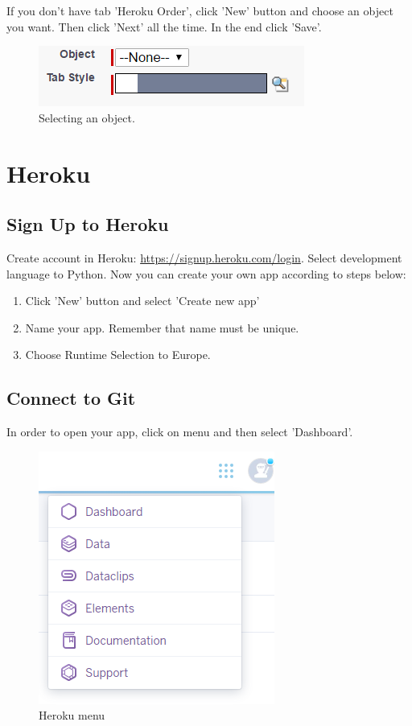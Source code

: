 \documentclass[12pt,a4paper]{article}
\begin{document}
If you don't have tab 'Heroku Order', click 'New' button and choose an object you want. Then click 'Next' all the time. In the end click 'Save'.

\begin{figure}[H]
	\centering
	\includegraphics{images/tabobj.PNG}
	\caption{Selecting an object.}
	\label{fig:tabbb}
\end{figure}
 
\section{Heroku}
\subsection{Sign Up to Heroku}
Create account in Heroku: \url{https://signup.heroku.com/login}. Select development language to Python. 
Now you can create your own app according to steps below:

\begin{enumerate}
	\item Click 'New' button and select 'Create new app'
	\item Name your app. Remember that name must be unique.
	\item Choose Runtime Selection to Europe. 
\end{enumerate}

\subsection{Connect to Git}
In order to open your app, click on menu and then select 'Dashboard'.\\

\begin{figure}[H]
	\centering
	\includegraphics{images/dashboard.PNG}
	\caption{Heroku menu}
	\label{fig:menu}
\end{figure}
\end{document}
